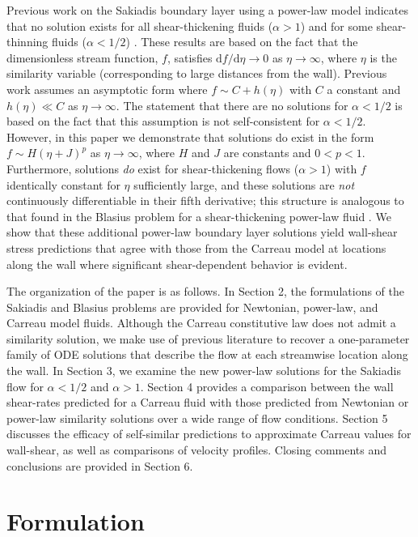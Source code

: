 \documentclass[lineno]{JFM-FLM_Au}
\begin{document}
Previous work on the Sakiadis boundary layer using a power-law model indicates that no solution exists for all shear-thickening fluids ($\alpha > 1$) and for some shear-thinning fluids ($\alpha < 1/2$) \citep{Fox, NonNewtonian}. These results are based on the fact that the dimensionless stream function, $f$, satisfies $\text{d}f/\text{d}\eta \to 0$ as $\eta \to \infty$, where $\eta$ is the similarity variable (corresponding to large distances from the wall). Previous work assumes an asymptotic form where $f \sim C + h(\eta)$ with $C$ a constant and $h(\eta) \ll C$ as $\eta \to \infty$. The statement that there are no solutions for $\alpha < 1/2$ is based on the fact that this assumption is not self-consistent for $\alpha < 1/2$.  However, in this paper we demonstrate that solutions do exist in the form $f \sim H(\eta + J)^p$ as $\eta \to \infty$, where $H$ and $J$ are constants and $0<p<1$.  Furthermore, solutions \textit{do} exist for shear-thickening flows ($\alpha > 1$) with $f$ identically constant for $\eta$ sufficiently large, and these solutions are \textit{not} continuously differentiable in their fifth derivative; this structure is analogous to that found in the Blasius problem for a shear-thickening power-law fluid \citep{Zhizhin1978-us, Pavlov1982-qh}. We show that these additional power-law boundary layer solutions yield wall-shear stress predictions that agree with those from the Carreau model at locations along the wall where significant shear-dependent behavior is evident.

The organization of the paper is as follows. In Section 2, the formulations of the Sakiadis and Blasius problems are provided for Newtonian, power-law, and Carreau model fluids. Although the Carreau constitutive law does not admit a similarity solution, we make use of previous literature \citep{Griffiths} to recover a one-parameter family of ODE solutions that describe the flow at each streamwise location along the wall. In Section 3, we examine the new power-law solutions for the Sakiadis flow for $\alpha < 1/2$ and $\alpha > 1$. Section 4 provides a comparison between the wall shear-rates predicted for a Carreau fluid with those predicted from Newtonian or power-law similarity solutions over a wide range of flow conditions. Section 5 discusses the efficacy of self-similar predictions to approximate Carreau values for wall-shear, as well as comparisons of velocity profiles. Closing comments and conclusions are provided in Section 6.

\section{Formulation}
\end{document}
